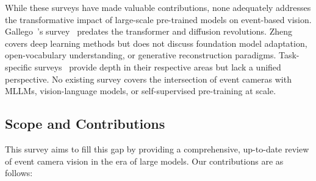 While these surveys have made valuable contributions, none adequately addresses the transformative impact of large-scale pre-trained models on event-based vision. Gallego~\etal's survey~\cite{gallego2022survey} predates the transformer and diffusion revolutions. Zheng~\etal~\cite{zheng2024deeplearning} covers deep learning methods but does not discuss foundation model adaptation, open-vocabulary understanding, or generative reconstruction paradigms. Task-specific surveys~\cite{xu2025recon3d,kar2025restoration,ghosh2025stereodepth} provide depth in their respective areas but lack a unified perspective. No existing survey covers the intersection of event cameras with MLLMs, vision-language models, or self-supervised pre-training at scale.


\subsection{Scope and Contributions}
\label{sec:intro_scope}

This survey aims to fill this gap by providing a comprehensive, up-to-date review of event camera vision in the era of large models. Our contributions are as follows:

